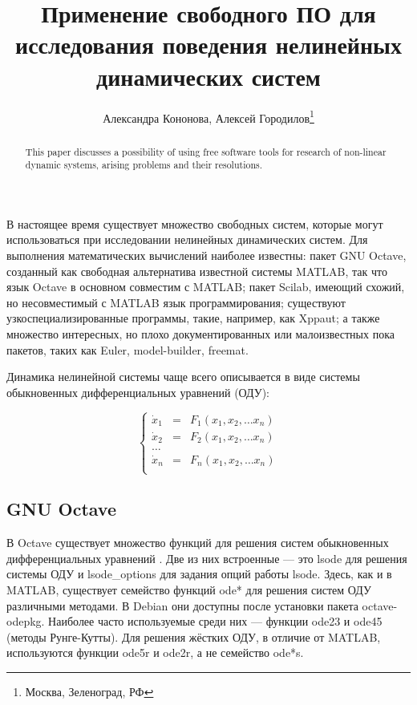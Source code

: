 \documentclass[10pt, a5paper]{article}
\begin{document}
\title{Применение свободного ПО для исследования поведения нелинейных динамических систем}%

\author{Александра Кононова, Алексей Городилов\footnote{Москва, Зеленоград, РФ}}
\maketitle

\begin{abstract}
This paper discusses a possibility of using free software tools for research of non-linear dynamic systems, arising problems and their resolutions.
\end{abstract}

В настоящее время существует множество свободных систем, которые могут использоваться при исследовании нелинейных динамических систем. Для выполнения математических вычислений наиболее известны: пакет GNU Octave, созданный как свободная альтернатива известной системы MATLAB, так что язык Octave в основном совместим с MATLAB; пакет Scilab, имеющий схожий, но несовместимый с MATLAB язык программирования; существуют узкоспециализированные программы, такие, например, как Xppaut; а также множество интересных, но плохо документированных или малоизвестных пока пакетов, таких как Euler, model-builder, freemat.

Динамика нелинейной системы чаще всего описывается в виде системы обыкновенных дифференциальных уравнений (ОДУ):

$$
\left\{ 
\begin{array}{lll}
\dot x_1 &=& F_1(x_1, x_2,   \ldots  x_n )  \\
\dot x_2 &=& F_2(x_1, x_2,   \ldots  x_n )  \\
\ldots \\
\dot x_n &=& F_n(x_1, x_2,  \ldots  x_n )  \\
\end{array}
\right.
$$

\subsection*{GNU Octave}

В Octave существует множество функций для решения систем обыкновенных дифференциальных уравнений \cite{Kon1}. Две из них встроенные --- это lsode для решения системы ОДУ и lsode\_options для задания опций работы lsode. Здесь, как и в MATLAB, существует семейство функций ode* для решения систем ОДУ различными методами. В Debian они доступны после установки пакета octave-odepkg. Наиболее часто используемые среди них --- функции ode23 и ode45 (методы Рунге-Кутты). Для решения жёстких ОДУ, в отличие от MATLAB, используются функции ode5r и ode2r, а не семейство ode*s.
\end{document}
